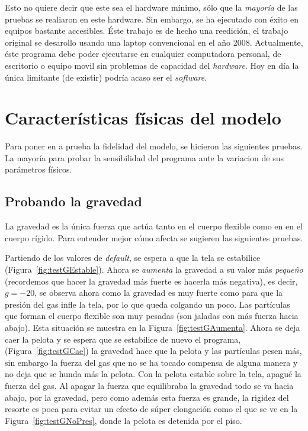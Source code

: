 Esto no quiere decir que este sea el hardware mínimo, sólo que la \emph{mayoría} de las pruebas se realiaron en este hardware.
Sin embargo, se ha ejecutado con éxito en equipos bastante accesibles. 
Éste trabajo es de hecho una reedición, el trabajo original se desarollo usando una laptop convencional en el año 2008.
Actualmente, éste programa debe poder ejecutarse en cualquier computadora personal, de escritorio o equipo movil sin problemas de capacidad del \emph{\textenglish{hardware}}.
Hoy en día la única limitante (de existir) podría acaso ser el \emph{\textenglish{software}}.

\section{Características físicas del modelo}
Para poner en a prueba la fidelidad del modelo, se hicieron las siguientes pruebas.
La mayoría para probar la sensibilidad del programa ante la variacion de sus parámetros físicos.

\subsection{Probando la gravedad}
La gravedad es la única fuerza que actúa tanto en el cuerpo flexible como en en el cuerpo rígido. Para entender mejor cómo afecta se sugieren las siguientes pruebas.

Partiendo de los valores de \emph{\textenglish{default}}, se espera a que la tela se estabilice (Figura~\ref{fig:testGEstable}).
Ahora se \emph{aumenta} la gravedad a su valor más \emph{pequeño} (recordemos que hacer la gravedad más fuerte es hacerla más negativa), es decir, $g=-20$, se observa ahora como la gravedad es muy fuerte como para que la presión del gas infle la tela, por lo que queda colgando un poco.
Las partículas que forman el cuerpo flexible son muy pesadas (son jaladas con más fuerza hacia abajo).
Esta situación se muestra en la Figura~\ref{fig:testGAumenta}. 
Ahora se deja caer la pelota y se espera que se estabilice de nuevo el programa, (Figura~\ref{fig:testGCae}) la gravedad hace que la pelota y las partículas pesen más, sin embargo la fuerza del gas que no se ha tocado compensa de alguna manera y no deja que se hunda más la pelota.
Con la pelota estable sobre la tela, apagué la fuerza del gas.
Al apagar la fuerza que equilibraba la gravedad todo se va hacia abajo, por la gravedad, pero como además esta fuerza es grande, la rigidez del resorte es poca para evitar un efecto de súper elongación como el que se ve en la Figura~\ref{fig:testGNoPres}, donde la pelota es detenida por el piso.

